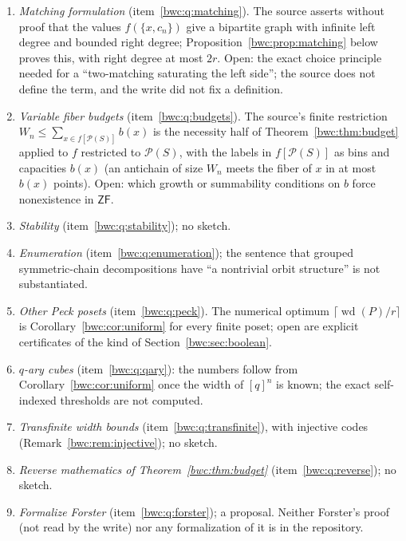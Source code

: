 \documentclass[11pt,letterpaper]{article}
\numberwithin{equation}{section}
\theoremstyle{plain}
\theoremstyle{definition}
\theoremstyle{remark}
\newcommand{\Pow}{\mathcal P}
\newcommand{\pwidth}{\operatorname{wd}}
\newcommand{\ZF}{\mathsf{ZF}}
\begin{document}
\begin{enumerate}[label=F\arabic*.,ref=F\arabic*]
 of $X$ onto a set that carries two disjoint copies of itself.
\item\label{bwc:fq:matching} \emph{Matching formulation}
 (item~\ref{bwc:q:matching}). The source asserts without proof that the values
 $f(\{x,c_n\})$ give a bipartite graph with infinite left degree and bounded
 right degree; Proposition~\ref{bwc:prop:matching} below proves this, with
 right degree at most $2r$. Open: the exact choice principle needed for a
 ``two-matching saturating the left side''; the source does not define the
 term, and the write did not fix a definition.
\item\label{bwc:fq:budgets} \emph{Variable fiber budgets}
 (item~\ref{bwc:q:budgets}). The source's finite restriction
 $W_n\leq\sum_{x\in f[\Pow(S)]}b(x)$ is the necessity half of
 Theorem~\ref{bwc:thm:budget} applied to $f$ restricted to $\Pow(S)$, with the
 labels in $f[\Pow(S)]$ as bins and capacities $b(x)$ (an antichain of size
 $W_n$ meets the fiber of $x$ in at most $b(x)$ points). Open: which growth or
 summability conditions on $b$ force nonexistence in $\ZF$.
\item\label{bwc:fq:stability} \emph{Stability} (item~\ref{bwc:q:stability});
 no sketch.
\item\label{bwc:fq:enumeration} \emph{Enumeration}
 (item~\ref{bwc:q:enumeration}); the sentence that grouped symmetric-chain
 decompositions have ``a nontrivial orbit structure'' is not substantiated.
\item\label{bwc:fq:peck} \emph{Other Peck posets} (item~\ref{bwc:q:peck}). The
 numerical optimum $\lceil\pwidth(P)/r\rceil$ is
 Corollary~\ref{bwc:cor:uniform} for every finite poset; open are explicit
 certificates of the kind of Section~\ref{bwc:sec:boolean}.
\item\label{bwc:fq:qary} \emph{$q$-ary cubes} (item~\ref{bwc:q:qary}): the
 numbers follow from Corollary~\ref{bwc:cor:uniform} once the width of $[q]^n$
 is known; the exact self-indexed thresholds are not computed.
\item\label{bwc:fq:transfinite} \emph{Transfinite width bounds}
 (item~\ref{bwc:q:transfinite}), with injective codes
 (Remark~\ref{bwc:rem:injective}); no sketch.
\item\label{bwc:fq:reverse} \emph{Reverse mathematics of
 Theorem~\ref{bwc:thm:budget}} (item~\ref{bwc:q:reverse}); no sketch.
\item\label{bwc:fq:forster} \emph{Formalize Forster} (item~\ref{bwc:q:forster});
 a proposal. Neither Forster's proof (not read by the write) nor any
 formalization of it is in the repository.

\end{enumerate}
\end{document}
